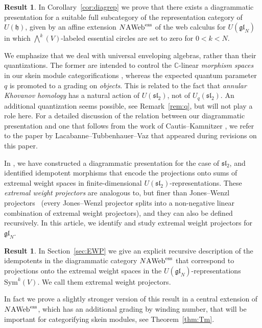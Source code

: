 \documentclass[11pt]{article}
\theoremstyle{definition}
\newtheorem{result}[theo]{Result}
\numberwithin{equation}{section}
\newcommand{\slnn}[1]{\mf{sl}_{#1}}
\newcommand{\glnn}[1]{\mf{gl}_{#1}}
\def\mf{\mathfrak}
\def\C{{\mathbb C}}
\newcommand{\cat}[1]{\ensuremath{\mbox{\bfseries {\upshape {#1}}}}}
\newcommand{\bVn}{\bigwedge}
\newcommand{\sym}{\mathrm{Sym}}
\newcommand{\AWeb}[1][]{#1\cat{A}\cat{Web}}
\newcommand{\essAWeb}[1][]{#1\AWeb^{\mathrm{ess}}}
\begin{document}
\begin{result}
In Corollary~\ref{cor:diagrep} we prove that there exists a
diagrammatic presentation for a suitable full subcategory of the representation
category of $U(\mathfrak{h})$, given by an affine extension $\essAWeb[N]$ of the
web calculus for $U(\glnn{N})$ in which $\bVn^k(V)$-labeled essential circles
are set to zero for $0<k<N$.
\end{result}

We emphasize that we deal with universal enveloping algebras, rather than their
quantizations. The former are intended to control the $\C$-linear \textit{morphism
spaces} in our skein module categorifications \cite[Section 1.3]{QW}, whereas
the expected quantum parameter $q$ is promoted to a grading on \textit{objects}.
This is related to the fact that \textit{annular Khovanov homology} \cite{GLW}
has a natural action of $U(\slnn{2})$, not of $U_q(\slnn{2})$. An additional
quantization seems possible, see Remark~\ref{rem:q}, but will not play a role
here. For a detailed discussion of the relation between our diagrammatic
presentation and one that follows from the work of Cautis--Kamnitzer
\cite[Section 2.6]{CK_ann}, we refer to the paper by Lacabanne--Tubbenhauer--Vaz
\cite{LTV} that appeared during revisions on this paper.

In \cite{QW}, we have constructed a diagrammatic presentation for the case of
$\slnn{2}$, and identified idempotent morphisms that encode the projections onto
sums of extremal weight spaces in finite-dimensional
$U(\slnn{2})$-representations. These \textit{extremal weight projectors} are
analogous to, but finer than Jones--Wenzl projectors~\cite{Jon2,Wen} (every
Jones--Wenzl projector splits into a non-negative linear combination of extremal
weight projectors), and they can also be defined recursively. In this article,
we identify and study extremal weight projectors for $\glnn{N}$. 

\begin{result} In Section~\ref{sec:EWP} we give an explicit recursive
  description of the idempotents in the diagrammatic category $\essAWeb[N]$ that
  correspond to projections onto the extremal weight spaces in the
  $U(\glnn{N})$-representations $\sym^k(V)$. We call them extremal weight projectors.
\end{result} 

In fact we prove a slightly stronger version of this result in a central
extension of $\essAWeb[N]$, which has an additional grading by winding number,
that will be important for categorifying skein modules, see
Theorem~\ref{thm:Tm}.
\end{document}
